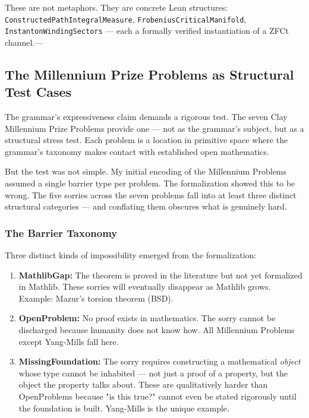 \documentclass[12pt,a4paper]{article}
\begin{document}
These are not metaphors. They are concrete Lean structures: \texttt{ConstructedPathIntegralMeasure}, \texttt{FrobeniusCriticalManifold}, \texttt{InstantonWindingSectors} --- each a formally verified instantiation of a ZFCt channel.---

\subsection{The Millennium Prize Problems as Structural Test Cases}

The grammar's expressiveness claim demands a rigorous test. The seven Clay Millennium Prize Problems provide one --- not as the grammar's subject, but as a structural stress test. Each problem is a location in primitive space where the grammar's taxonomy makes contact with established open mathematics.

But the test was not simple. My initial encoding of the Millennium Problems assumed a single barrier type per problem. The formalization showed this to be wrong. The five sorries across the seven problems fall into at least three distinct structural categories --- and conflating them obscures what is genuinely hard.

\subsubsection{The Barrier Taxonomy}

Three distinct kinds of impossibility emerged from the formalization:

\begin{enumerate}
    \item \textbf{MathlibGap:} The theorem is proved in the literature but not yet formalized in Mathlib. These sorries will eventually disappear as Mathlib grows. Example: Mazur's torsion theorem (BSD).
    \item \textbf{OpenProblem:} No proof exists in mathematics. The sorry cannot be discharged because humanity does not know how. All Millennium Problems except Yang-Mills fall here.
    \item \textbf{MissingFoundation:} The sorry requires constructing a mathematical \emph{object} whose type cannot be inhabited --- not just a proof of a property, but the object the property talks about. These are qualitatively harder than OpenProblems because "is this true?" cannot even be stated rigorously until the foundation is built. Yang-Mills is the unique example.
\end{enumerate}
\end{document}
